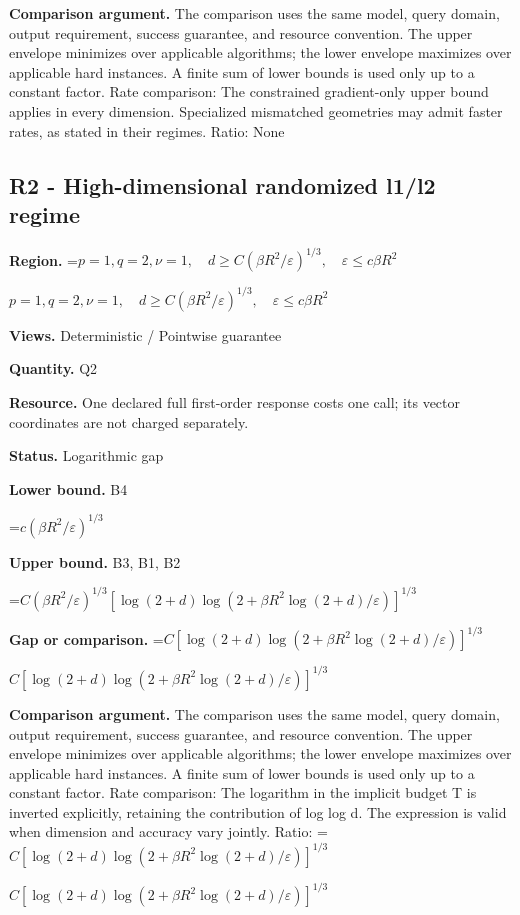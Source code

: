 \documentclass[10pt,a4paper]{article}
\newcommand{\AtlasMath}[1]{\par\begingroup\centering\setbox0=\hbox{$\displaystyle #1$}\ifdim\wd0>1.4\linewidth\typeout{ATLAS WIDE FORMULA: \the\wd0}\fi\ifdim\wd0>\linewidth\resizebox{\linewidth}{!}{\box0}\else\box0\fi\par\endgroup}
\newcommand{\AtlasInlineMath}[1]{\begingroup\setbox0=\hbox{$#1$}\ifdim\wd0>.4\linewidth\endgroup\AtlasMath{#1}\else\endgroup$#1$\fi}
\begin{document}
\textbf{Comparison argument.} The comparison uses the same model, query domain, output requirement, success guarantee, and resource convention. The upper envelope minimizes over applicable algorithms; the lower envelope maximizes over applicable hard instances. A finite sum of lower bounds is used only up to a constant factor. Rate comparison: The constrained gradient-only upper bound applies in every dimension. Specialized mismatched geometries may admit faster rates, as stated in their regimes. Ratio: None



\subsection{R2 - High-dimensional randomized l1/l2 regime}


\textbf{Region.} \AtlasInlineMath{p=1,q=2,\nu=1,\quad d\ge C(\beta R^2/\varepsilon)^{1/3},\quad\varepsilon\le c\beta R^2}



\textbf{Views.} Deterministic / Pointwise guarantee



\textbf{Quantity.} Q2



\textbf{Resource.} One declared full first-order response costs one call; its vector coordinates are not charged separately.



\textbf{Status.} Logarithmic gap



\textbf{Lower bound.} B4



\AtlasMath{c(\beta R^2/\varepsilon)^{1/3}}


\textbf{Upper bound.} B3, B1, B2



\AtlasMath{C(\beta R^2/\varepsilon)^{1/3}[\log(2+d)\log(2+\beta R^2\log(2+d)/\varepsilon)]^{1/3}}


\textbf{Gap or comparison.} \AtlasInlineMath{C[\log(2+d)\log(2+\beta R^2\log(2+d)/\varepsilon)]^{1/3}}



\textbf{Comparison argument.} The comparison uses the same model, query domain, output requirement, success guarantee, and resource convention. The upper envelope minimizes over applicable algorithms; the lower envelope maximizes over applicable hard instances. A finite sum of lower bounds is used only up to a constant factor. Rate comparison: The logarithm in the implicit budget T is inverted explicitly, retaining the contribution of log log d. The expression is valid when dimension and accuracy vary jointly. Ratio: \AtlasInlineMath{C[\log(2+d)\log(2+\beta R^2\log(2+d)/\varepsilon)]^{1/3}}
\end{document}
